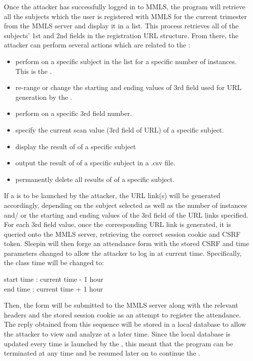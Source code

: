 \documentclass[runningheads]{llncs}
\begin{document}
Once the attacker has successfully logged in to MMLS, the program will retrieve all the subjects which the user is registered with MMLS for the current trimester from the MMLS server and display it in a list. This process retrieves all of the subjects' 1st and 2nd fields in the registration URL structure. From there, the attacker can perform several actions which are related to the \scanattack{}:
\begin{itemize}
    \item perform \theattack{} on a specific subject in the list for a specific number of instances. This is the \scanattack{}.
    \item re-range or change the starting and ending values of 3rd field used for URL generation by the \scanattack{}.
    \item perform \theattack{} on a specific 3rd field number.
    \item specify the current scan value (3rd field of URL) of a specific subject.
    \item display the result of \scanattack{} of a specific subject
    \item output the result of \scanattack{} of a specific subject in a .csv file.
    \item permanently delete all results of \scanattack{} of a specific subject.
\end{itemize}

\clearpage

If a \scanattack{} is to be launched by the attacker, the URL link(s) will be generated accordingly, depending on the subject selected as well as the number of instances and/ or the starting and ending values of the 3rd field of the URL links specified. For each 3rd field value, once the corresponding URL link is generated, it is queried onto the MMLS server, retrieving the correct session cookie and CSRF token. Sleepin will then forge an attendance form with the stored CSRF and time parameters changed to allow the attacker to log in at current time. Specifically, the class time will be changed to:
\begin{center}
    start time  : current time - 1 hour\\
    end time    : current time + 1 hour\\ 
\end{center}

Then, the form will be submitted to the MMLS server along with the relevant headers and the stored session cookie as an attempt to register the attendance. The reply obtained from this sequence will be stored in a local database to allow the attacker to view and analyze at a later time. Since the local database is updated every time \theattack{} is launched by the \scanattack{}, this meant that the program can be terminated at any time and be resumed later on to continue the \scanattack{}.
\end{document}
